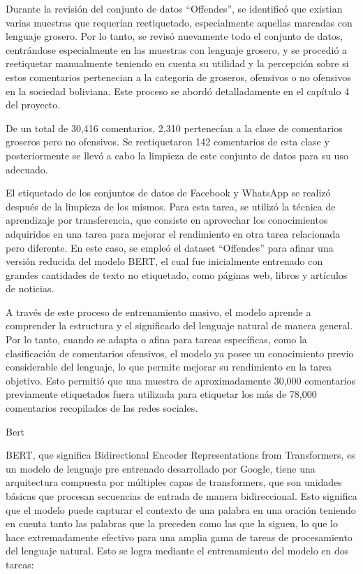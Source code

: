 Durante la revisión del conjunto de datos ``Offendes'', se identificó que existian varias muestras que requerían reetiquetado, especialmente aquellas marcadas con lenguaje grosero. Por lo tanto, se revisó nuevamente todo el conjunto de datos, centrándose especialmente en las muestras con lenguaje grosero, y se procedió a reetiquetar manualmente teniendo en cuenta su utilidad y la percepción sobre si estos comentarios pertenecian a la categoria de groseros, ofensivos o no ofensivos en la sociedad boliviana. Este proceso se abordó detalladamente en el capítulo 4 del proyecto.

De un total de 30,416 comentarios, 2,310 pertenecían a la clase de comentarios groseros pero no ofensivos. Se reetiquetaron 142 comentarios de esta clase y posteriormente se llevó a cabo la limpieza de este conjunto de datos para su uso adecuado.

El etiquetado de los conjuntos de datos de Facebook y WhatsApp se realizó después de la limpieza de los mismos. Para esta tarea, se utilizó la técnica de aprendizaje por transferencia, que consiste en aprovechar los conocimientos adquiridos en una tarea para mejorar el rendimiento en otra tarea relacionada pero diferente. En este caso, se empleó el dataset ``Offendes'' para afinar una versión reducida del modelo BERT, el cual fue inicialmente entrenado con grandes cantidades de texto no etiquetado, como páginas web, libros y artículos de noticias.

A través de este proceso de entrenamiento masivo, el modelo aprende a comprender la estructura y el significado del lenguaje natural de manera general. Por lo tanto, cuando se adapta o afina para tareas específicas, como la clasificación de comentarios ofensivos, el modelo ya posee un conocimiento previo considerable del lenguaje, lo que permite mejorar su rendimiento en la tarea objetivo. Esto permitió que una muestra de aproximadamente 30,000 comentarios previamente etiquetados fuera utilizada para etiquetar los más de 78,000 comentarios recopilados de las redes sociales.

Bert

BERT, que significa Bidirectional Encoder Representations from Transformers, es un modelo de lenguaje pre entrenado desarrollado por Google, tiene una arquitectura compuesta por múltiples capas de transformers, que son unidades básicas que procesan secuencias de entrada de manera bidireccional. Esto significa que el modelo puede capturar el contexto de una palabra en una oración teniendo en cuenta tanto las palabras que la preceden como las que la siguen, lo que lo hace extremadamente efectivo para una amplia gama de tareas de procesamiento del lenguaje natural. Esto se logra mediante el entrenamiento del modelo en dos tareas: 

